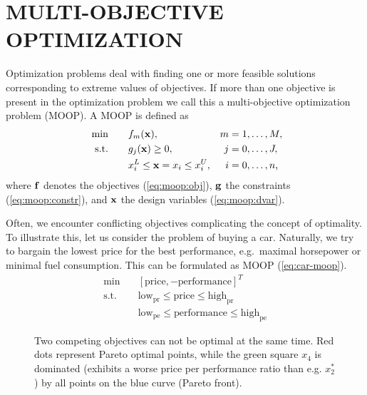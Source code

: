 \documentclass[%
reprint,
amsmath,amssymb,
aps,
prstab,
]{revtex4-1}
\begin{document}
\section{MULTI-OBJECTIVE OPTIMIZATION} \label{sec:optimization}

Optimization problems deal with finding one or more feasible solutions
  corresponding to extreme values of objectives.
If more than one objective is present in the optimization problem we call this
  a multi-objective optimization problem (MOOP).
A MOOP is defined as
%
\begin{align}
  \text{ min} \quad & \quad f_m({\bf x}), ~& m &= 1, \dots, M, \label{eq:moop:obj}\\
  \text{s.t.} \quad & \quad g_j({\bf x}) \geq 0, & j &= 0, \dots, J,
  \label{eq:moop:constr}\\
  \quad & \quad  x_i^L \leq {\bf x}=x_i \leq x_i^U,& i &=0, \dots, n
  \label{eq:moop:dvar} \text{,}
\end{align}
%
where $\bf f$ denotes the objectives (\ref{eq:moop:obj}),
  $\bf g$ the constraints (\ref{eq:moop:constr}),
  and $\bf x$ the design variables (\ref{eq:moop:dvar}).

Often, we encounter conflicting objectives complicating the concept of
  optimality.
To illustrate this, let us consider the problem of buying a car.
Naturally, we try to bargain the lowest price for the best performance,
  e.g.\ maximal horsepower or minimal fuel consumption.
This can be formulated as MOOP (\ref{eq:car-moop}).
%
\begin{equation}
  \begin{array}{cl}
  \min          & \quad \left[ \text{price}, -\text{performance} \right]^T \\
    \text{s.t.} & \quad \text{low}_\text{pr} \leq \text{price} \leq \text{high}_\text{pr}\\
                & \quad \text{low}_\text{pe} \leq \text{performance} \leq \text{high}_\text{pe}
  \end{array}
  \label{eq:car-moop}
\end{equation}

\begin{figure}
  \begin{center}
    \begin{tikzpicture}[scale=1.3, transform shape]
      
    \end{tikzpicture}
  \end{center}
  \caption{Two competing objectives can not be optimal at the same time.
    Red dots represent Pareto optimal points, while the green square $x_4$ is
    dominated (exhibits a worse price per performance ratio than e.g. $x_2^*$)
    by all points on the blue curve (Pareto front).
  }
  \label{fig:tradeoff}
\end{figure}
\end{document}
